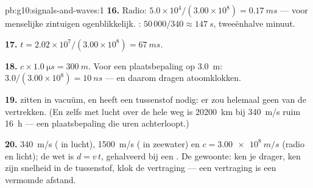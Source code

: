 \begin{solution}{pb:g10:signals-and-waves:1}
\textbf{16.} Radio: $5.0\times10^{4}/(3.00\times10^{8}) =
\qty{0.17}{ms}$ --- voor menselijke zintuigen ogenblikkelijk. :
$50\,000/340 \approx \qty{147}{s}$, tweeënhalve minuut.

\textbf{17.} $t = 2.02\times10^{7}/(3.00\times10^{8}) = \qty{67}{ms}$.

\textbf{18.} $c \times \qty{1.0}{\micro s} = \qty{300}{m}$. Voor een
plaatsbepaling op \qty{3.0}{m}: $3.0/(3.00\times10^{8}) = \qty{10}{ns}$
--- en daarom dragen  atoomklokken.

\textbf{19.}  zitten in vacuüm, en  heeft een
tussenstof nodig: er zou helemaal geen  van de 
vertrekken. (En zelfs met lucht over de hele weg is \qty{20200}{km} bij
\qty{340}{m/s} ruim \qty{16}{h} --- een plaatsbepaling die uren
achterloopt.)

\textbf{20.} \qty{340}{m/s} ( in lucht), \qty{1500}{m/s} (
in zeewater) en $c = \qty{3.00e8}{m/s}$ (radio en licht); de wet is
$d = v\,t$, gehalveerd bij een . De gewoonte: ken je drager, ken
zijn snelheid in de tussenstof, klok de vertraging --- een vertraging is
een vermomde afstand.
\end{solution}
